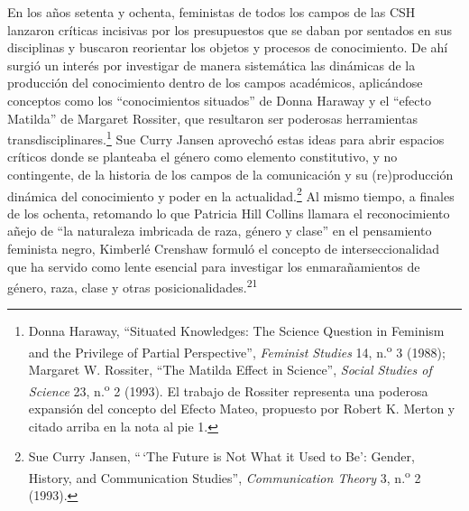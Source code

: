 \documentclass{tufte-handout}
\begin{document}
En los años setenta y ochenta, feministas de todos los campos de las CSH
lanzaron críticas incisivas por los presupuestos que se daban por
sentados en sus disciplinas y buscaron reorientar los objetos y procesos
de conocimiento. De ahí surgió un interés por investigar de manera
sistemática las dinámicas de la producción del conocimiento dentro de
los campos académicos, aplicándose conceptos como los ``conocimientos
situados'' de Donna Haraway y el ``efecto Matilda'' de Margaret
Rossiter, que resultaron ser poderosas herramientas
transdisciplinares.\footnote{Donna Haraway, ``Situated Knowledges: The
  Science Question in Feminism and the Privilege of Partial
  Perspective'', \emph{Feminist Studies} 14, n.\textsuperscript{o} 3
  (1988); Margaret W. Rossiter, ``The Matilda Effect in Science'',
  \emph{Social Studies of Science} 23, n.\textsuperscript{o} 2 (1993).
  El trabajo de Rossiter representa una poderosa expansión del concepto
  del Efecto Mateo, propuesto por Robert K. Merton y citado arriba en la
  nota al pie 1.} Sue Curry Jansen aprovechó estas ideas para abrir
espacios críticos donde se planteaba el género como elemento
constitutivo, y no contingente, de la historia de los campos de la
comunicación y su (re)producción dinámica del conocimiento y poder en la
actualidad.\footnote{Sue Curry Jansen, ``\,`The Future is Not What it
  Used to Be': Gender, History, and Communication Studies'',
  \emph{Communication Theory} 3, n.\textsuperscript{o} 2 (1993).} Al
mismo tiempo, a finales de los ochenta, retomando lo que Patricia Hill
Collins llamara el reconocimiento añejo de ``la naturaleza imbricada de
raza, género y clase'' en el pensamiento feminista negro, Kimberlé
Crenshaw formuló el concepto de interseccionalidad que ha servido como
lente esencial para investigar los enmarañamientos de género, raza,
clase y otras posicionalidades.\textsuperscript{21}
\end{document}
